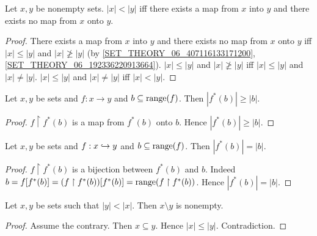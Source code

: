 \documentclass[../set-theory.tex]{subfiles}
\begin{document}
  \begin{forthel}
    \begin{proposition}
      Let $x, y$ be nonempty sets.
      $|x| < |y|$ iff there exists a map from $x$ into $y$ and there exists no
      map from $x$ onto $y$.
    \end{proposition}
    \begin{proof}
      There exists a map from $x$ into $y$ and there exists no map from $x$ onto
      $y$ iff $|x| \leq |y|$ and $|x| \ngeq |y|$ (by
      \cref{SET_THEORY_06_407116133171200},
      \cref{SET_THEORY_06_192336220913664}).
      $|x| \leq |y|$ and $|x| \ngeq |y|$ iff $|x| \leq |y|$ and $|x| \neq |y|$.
      $|x| \leq |y|$ and $|x| \neq |y|$ iff $|x| < |y|$.
    \end{proof}
  \end{forthel}

  \begin{forthel}
    \begin{proposition}
      Let $x, y$ be sets and $f : x \to y$ and $b \subseteq \operatorname{range}(f)$.
      Then $|f^{*}(b)| \geq |b|$.
    \end{proposition}
    \begin{proof}
      $f \restriction f^{*}(b)$ is a map from $f^{*}(b)$ onto $b$.
      Hence $|f^{*}(b)| \geq |b|$.
    \end{proof}
  \end{forthel}

  \begin{forthel}
    \begin{proposition}
      Let $x, y$ be sets and $f : x \hookrightarrow y$ and $b \subseteq \operatorname{range}(f)$.
      Then $|f^{*}(b)| = |b|$.
    \end{proposition}
    \begin{proof}
      $f \restriction f^{*}(b)$ is a bijection between $f^{*}(b)$ and $b$.
      Indeed $b
        = f[f^{*}(b)]
        = (f \restriction f^{*}(b))[f^{*}(b)]
        = \operatorname{range}(f \restriction f^{*}(b))$.
      Hence $|f^{*}(b)| = |b|$.
    \end{proof}
  \end{forthel}

  \begin{forthel}
    \begin{proposition}
      Let $x, y$ be sets such that $|y| < |x|$.
      Then $x \setminus y$ is nonempty.
    \end{proposition}
    \begin{proof}
      Assume the contrary.
      Then $x \subseteq y$.
      Hence $|x| \leq |y|$.
      Contradiction.
    \end{proof}
  \end{forthel}
\end{document}
